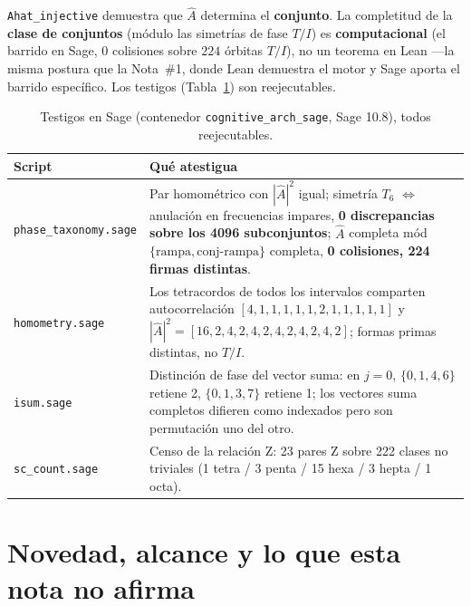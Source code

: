 \documentclass[11pt]{article}
\newcommand{\lean}[1]{\texttt{#1}}
\newcommand{\Ahat}{\hat{A}}
\begin{document}
\lean{Ahat\_injective} demuestra que $\Ahat$ determina el \textbf{conjunto}. La completitud de la
\textbf{clase de conjuntos} (módulo las simetrías de fase $T/I$) es \textbf{computacional} (el barrido en
Sage, $0$ colisiones sobre $224$ órbitas $T/I$), no un teorema en Lean ---la misma postura que la
Nota~\#1, donde Lean demuestra el motor y Sage aporta el barrido específico. Los testigos
(Tabla~\ref{tab:sage}) son reejecutables.

\begin{table}[H]
\centering\small
{}
\begin{tabular}{@{}l p{}@{}}
\toprule
\rowcolor{ctA!22}
\textbf{Script} & \textbf{Qué atestigua}\\
\midrule
\lean{phase\_taxonomy.sage} & Par homométrico con $|\Ahat|^2$ igual; simetría $T_6$ $\iff$ anulación en frecuencias impares, \textbf{0 discrepancias sobre los 4096 subconjuntos}; $\Ahat$ completa mód $\{\text{rampa},\text{conj-rampa}\}$ completa, \textbf{0 colisiones, 224 firmas distintas}.\\
\lean{homometry.sage}       & Los tetracordos de todos los intervalos comparten autocorrelación $[4,1,1,1,1,1,2,1,1,1,1,1]$ y $|\Ahat|^2=[16,2,4,2,4,2,4,2,4,2,4,2]$; formas primas distintas, no $T/I$.\\
\lean{isum.sage}            & Distinción de fase del vector suma: en $j=0$, $\{0,1,4,6\}$ retiene 2, $\{0,1,3,7\}$ retiene 1; los vectores suma completos difieren como indexados pero son permutación uno del otro.\\
\lean{sc\_count.sage}       & Censo de la relación Z: 23 pares Z sobre 222 clases no triviales (1 tetra / 3 penta / 15 hexa / 3 hepta / 1 octa).\\
\bottomrule
\end{tabular}
\caption{Testigos en Sage (contenedor \lean{cognitive\_arch\_sage}, Sage 10.8), todos reejecutables.}
\label{tab:sage}
\end{table}

\section{Novedad, alcance y lo que esta nota no afirma}\label{sec:novelty}
\end{document}
